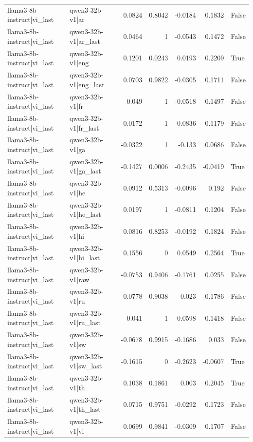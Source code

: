 \begin{table}
\begin{tabular}{l l r r r r l}
llama3-8b-instruct|vi_last & qwen3-32b-v1|ar & 0.0824 & 0.8042 & -0.0184 & 0.1832 & False \\
llama3-8b-instruct|vi_last & qwen3-32b-v1|ar_last & 0.0464 & 1 & -0.0543 & 0.1472 & False \\
llama3-8b-instruct|vi_last & qwen3-32b-v1|eng & 0.1201 & 0.0243 & 0.0193 & 0.2209 & True \\
llama3-8b-instruct|vi_last & qwen3-32b-v1|eng_last & 0.0703 & 0.9822 & -0.0305 & 0.1711 & False \\
llama3-8b-instruct|vi_last & qwen3-32b-v1|fr & 0.049 & 1 & -0.0518 & 0.1497 & False \\
llama3-8b-instruct|vi_last & qwen3-32b-v1|fr_last & 0.0172 & 1 & -0.0836 & 0.1179 & False \\
llama3-8b-instruct|vi_last & qwen3-32b-v1|ga & -0.0322 & 1 & -0.133 & 0.0686 & False \\
llama3-8b-instruct|vi_last & qwen3-32b-v1|ga_last & -0.1427 & 0.0006 & -0.2435 & -0.0419 & True \\
llama3-8b-instruct|vi_last & qwen3-32b-v1|he & 0.0912 & 0.5313 & -0.0096 & 0.192 & False \\
llama3-8b-instruct|vi_last & qwen3-32b-v1|he_last & 0.0197 & 1 & -0.0811 & 0.1204 & False \\
llama3-8b-instruct|vi_last & qwen3-32b-v1|hi & 0.0816 & 0.8253 & -0.0192 & 0.1824 & False \\
llama3-8b-instruct|vi_last & qwen3-32b-v1|hi_last & 0.1556 & 0 & 0.0549 & 0.2564 & True \\
llama3-8b-instruct|vi_last & qwen3-32b-v1|raw & -0.0753 & 0.9406 & -0.1761 & 0.0255 & False \\
llama3-8b-instruct|vi_last & qwen3-32b-v1|ru & 0.0778 & 0.9038 & -0.023 & 0.1786 & False \\
llama3-8b-instruct|vi_last & qwen3-32b-v1|ru_last & 0.041 & 1 & -0.0598 & 0.1418 & False \\
llama3-8b-instruct|vi_last & qwen3-32b-v1|sw & -0.0678 & 0.9915 & -0.1686 & 0.033 & False \\
llama3-8b-instruct|vi_last & qwen3-32b-v1|sw_last & -0.1615 & 0 & -0.2623 & -0.0607 & True \\
llama3-8b-instruct|vi_last & qwen3-32b-v1|th & 0.1038 & 0.1861 & 0.003 & 0.2045 & True \\
llama3-8b-instruct|vi_last & qwen3-32b-v1|th_last & 0.0715 & 0.9751 & -0.0292 & 0.1723 & False \\
llama3-8b-instruct|vi_last & qwen3-32b-v1|vi & 0.0699 & 0.9841 & -0.0309 & 0.1707 & False \\

\end{tabular}
\end{table}
